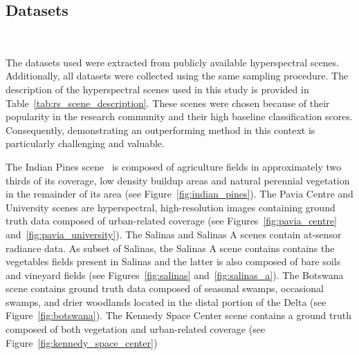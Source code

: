 \documentclass[parskip=full]{scrartcl}
\begin{document}
\subsection{Datasets}~\label{sec:datasets}

The datasets used were extracted from publicly available hyperspectral scenes.
Additionally, all datasets were collected using the same sampling procedure. The
description of the hyperspectral scenes used in this study is provided in
Table~\ref{tab:rs_scene_description}. These scenes were chosen because of
their popularity in the research community and their high baseline
classification scores. Consequently, demonstrating an outperforming method in
this context is particularly challenging and valuable.


The Indian Pines scene~\cite{Baumgardner2015} is composed of agriculture fields
in approximately two thirds of its coverage, low density buildup areas and
natural perennial vegetation in the remainder of its area (see
Figure~\ref{fig:indian_pines}). The Pavia Centre and University scenes are
hyperspectral, high-resolution images containing ground truth data composed of
urban-related coverage (see Figures~\ref{fig:pavia_centre}
and~\ref{fig:pavia_university}). The Salinas and Salinas A scenes contain
at-sensor radiance data. As subset of Salinas, the Salinas A scene contains
contains the vegetables fields present in Salinas and the latter is also
composed of bare soils and vineyard fields (see Figures~\ref{fig:salinas}
and~\ref{fig:salinas_a}). The Botswana scene contains ground truth data composed
of seasonal swamps, occasional swamps, and drier woodlands located in the distal
portion of the Delta (see Figure~\ref{fig:botswana}). The Kennedy Space Center
scene contains a ground truth composed of both vegetation and urban-related
coverage (see Figure~\ref{fig:kennedy_space_center})
\end{document}
